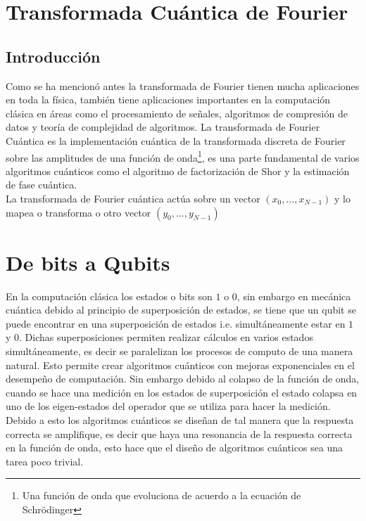 \documentclass[a4paper]{article}
\begin{document}
\section{Transformada Cuántica de Fourier}
\subsection{Introducción}
Como se ha mencionó antes la transformada de Fourier tienen mucha aplicaciones en toda la física, también tiene aplicaciones importantes en la computación clásica en áreas como el procesamiento de señales, algoritmos de compresión de datos y teoría de complejidad de algoritmos. La transformada de Fourier Cuántica es la implementación cuántica de la transformada discreta de Fourier sobre las amplitudes de una función de onda\footnote{Una función de onda que evoluciona de acuerdo a la ecuación de Schr\"{o}dinger}, es una parte fundamental de varios algoritmos cuánticos  como el algoritmo de factorización de Shor y la estimación de fase cuántica.\\
La transformada de Fourier cuántica actúa sobre un vector $(x_0, \hdots, x_{N-1})$ y lo mapea o transforma o otro vector
$(y_0, \hdots, y_{N-1})$
\section{De bits a Qubits}
En la computación clásica los estados o bits son $1$ o $0$, sin embargo en mecánica cuántica debido al principio de superposición de estados, se tiene que un qubit se puede encontrar en una superposición de estados i.e. simultáneamente estar en $1$ y $0$. Dichas superposiciones permiten realizar cálculos en varios estados simultáneamente, es decir se paralelizan los procesos de computo de una manera natural. Esto permite crear algoritmos cuánticos con mejoras exponenciales en el desempeño de computación. Sin embargo debido al colapso de la función de onda, cuando se hace una medición en los estados de superposición el estado colapsa en uno de los eigen-estados del operador que se utiliza para hacer la medición. \\
Debido a esto los algoritmos cuánticos se diseñan de tal manera que la respuesta correcta se amplifique, es decir que haya una resonancia de la respuesta correcta en la función de onda, esto hace que el diseño de algoritmos cuánticos sea una tarea poco trivial.
\end{document}
